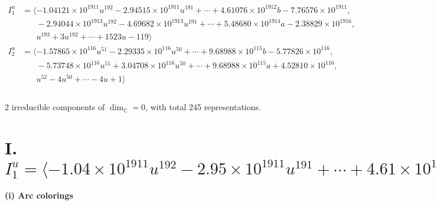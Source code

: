\documentclass[1p]{elsarticle_modified}
\theoremstyle{definition}
\begin{document}
\begin{align*}
I^u_{1}&=\langle 
-1.04121\times10^{1911} u^{192}-2.94515\times10^{1911} u^{191}+\cdots+4.61076\times10^{1912} b-7.76576\times10^{1911},\\
\phantom{I^u_{1}}&\phantom{= \langle  }-2.94044\times10^{1913} u^{192}-4.69682\times10^{1913} u^{191}+\cdots+5.48680\times10^{1914} a-2.38829\times10^{1916},\\
\phantom{I^u_{1}}&\phantom{= \langle  }u^{193}+3 u^{192}+\cdots+1523 u-119\rangle \\
I^u_{2}&=\langle 
-1.57865\times10^{116} u^{51}-2.29335\times10^{116} u^{50}+\cdots+9.68988\times10^{115} b-5.77826\times10^{116},\\
\phantom{I^u_{2}}&\phantom{= \langle  }-5.73748\times10^{116} u^{51}+3.04708\times10^{116} u^{50}+\cdots+9.68988\times10^{115} a+4.52810\times10^{116},\\
\phantom{I^u_{2}}&\phantom{= \langle  }u^{52}-4 u^{50}+\cdots-4 u+1\rangle \\
\\
\end{align*}
\raggedright * 2 irreducible components of $\dim_{\mathbb{C}}=0$, with total 245 representations.\\
\newpage
\renewcommand{\arraystretch}{1}
\centering \section*{I. $I^u_{1}= \langle -1.04\times10^{1911} u^{192}-2.95\times10^{1911} u^{191}+\cdots+4.61\times10^{1912} b-7.77\times10^{1911},\;-2.94\times10^{1913} u^{192}-4.70\times10^{1913} u^{191}+\cdots+5.49\times10^{1914} a-2.39\times10^{1916},\;u^{193}+3 u^{192}+\cdots+1523 u-119 \rangle$}
\flushleft \textbf{(i) Arc colorings}\\
\end{document}
